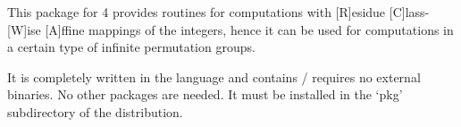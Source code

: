 
This package for {\GAP} 4 provides routines for 
computations with [R]esidue [C]lass-[W]ise [A]ffine mappings
of the integers, hence it can be used for computations in
a certain type of infinite permutation groups.

It is completely written in the {\GAP} language and contains /
requires no external binaries. No other packages are needed.
It must be installed in the `pkg' subdirectory of the
{\GAP} distribution.

